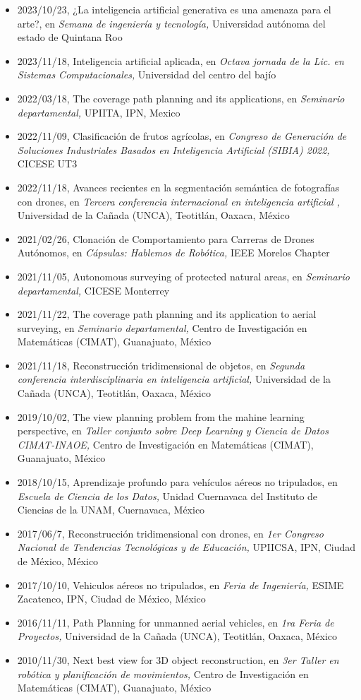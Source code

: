 \begin{itemize} 
\item 2023/10/23, ¿La inteligencia artificial generativa es una amenaza para el arte?, en \textit{ Semana de ingeniería y tecnología,} Universidad autónoma del estado de Quintana Roo 
\item 2023/11/18, Inteligencia artificial aplicada, en \textit{ Octava jornada de la Lic. en Sistemas Computacionales,} Universidad del centro del bajío 
\item 2022/03/18, The coverage path planning and its applications, en \textit{ Seminario departamental,} UPIITA, IPN, Mexico 
\item 2022/11/09, Clasificación de frutos agrícolas, en \textit{ Congreso de Generación de Soluciones Industriales Basados en Inteligencia Artificial (SIBIA) 2022,} CICESE UT3 
\item 2022/11/18, Avances recientes en la segmentación semántica de fotografías con drones, en \textit{ Tercera conferencia internacional en inteligencia artificial ,} Universidad de la Cañada (UNCA), Teotitlán, Oaxaca, México 
\item 2021/02/26, Clonación de Comportamiento para Carreras de Drones Autónomos, en \textit{ Cápsulas: Hablemos de Robótica,} IEEE Morelos Chapter 
\item 2021/11/05, Autonomous surveying of protected natural areas, en \textit{ Seminario departamental,} CICESE Monterrey 
\item 2021/11/22, The coverage path planning and its application to aerial surveying, en \textit{ Seminario departamental,} Centro de Investigación en Matemáticas (CIMAT), Guanajuato, México 
\item 2021/11/18, Reconstrucción tridimensional de objetos, en \textit{ Segunda conferencia interdisciplinaria en inteligencia artificial,} Universidad de la Cañada (UNCA), Teotitlán, Oaxaca, México 
\item 2019/10/02, The view planning problem from the mahine learning perspective, en \textit{ Taller conjunto sobre Deep Learning y Ciencia de Datos CIMAT-INAOE,} Centro de Investigación en Matemáticas (CIMAT), Guanajuato, México 
\item 2018/10/15, Aprendizaje profundo para vehículos aéreos no tripulados, en \textit{ Escuela de Ciencia de los Datos,} Unidad Cuernavaca del Instituto de Ciencias de la UNAM, Cuernavaca, México 
\item 2017/06/7, Reconstrucción tridimensional con drones, en \textit{ 1er Congreso Nacional de Tendencias Tecnológicas y de Educación,} UPIICSA, IPN, Ciudad de México, México 
\item 2017/10/10, Vehiculos aéreos no tripulados, en \textit{ Feria de Ingeniería,} ESIME Zacatenco, IPN, Ciudad de México, México 
\item 2016/11/11, Path Planning for unmanned aerial vehicles, en \textit{ 1ra Feria de Proyectos,} Universidad de la Cañada (UNCA), Teotitlán, Oaxaca, México 
\item 2010/11/30, Next best view for 3D object reconstruction, en \textit{ 3er Taller en robótica y planificación de movimientos,} Centro de Investigación en Matemáticas (CIMAT), Guanajuato, México 
\end{itemize} 
